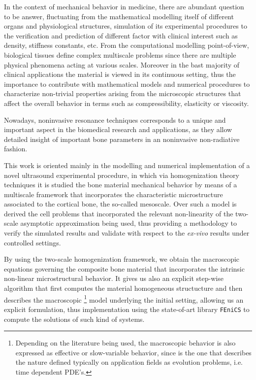 \begin{intro}
In the context of mechanical behavior in medicine, there are abundant question to be answer, fluctuating from the mathematical modelling itself of different organs and physiological structures, simulation of its experimental procedures to the verification and prediction of different factor with clinical interest such as density, stiffness constants, etc. From the computational modelling point-of-view, biological tissues define complex multiscale problems since there are multiple physical phenomena acting at various scales. Moreover in the bast majority of clinical applications the material is viewed in its continuous setting, thus the importance to contribute with mathematical models and numerical procedures to characterize non-trivial properties arising from the microscopic structures that affect the overall behavior in terms such as compressibility, elasticity or viscosity.

Nowadays, noninvasive resonance techniques corresponds to a unique and important aspect in the biomedical research and applications, as they allow detailed insight of important bone parameters in an noninvasive non-radiative fashion.

This work is oriented mainly in the modelling and numerical implementation of a novel ultrasound experimental procedure, in which via homogenization theory techniques it is studied the bone material mechanical behavior by means of a multiscale framework that incorporates the characteristic microstructure associated to the cortical bone, the so-called mesoscale.
Over such a model is derived the cell problems that incorporated the relevant non-linearity of the two-scale asymptotic approximation being used, thus providing a methodology to verify the simulated results and validate with respect to the \textit{ex-vivo} results under controlled settings.

By using the two-scale homogenization framework, we obtain the macroscopic equations governing the composite bone material that incorporates the intrinsic non-linear microstructural behavior.
It gives us also an explicit step-wise algorithm that first computes the material homogeneous structucture and then describes the macroscopic \footnote{Depending on the literature being used, the macroscopic behavior is also expressed as effective or slow-variable behavior, since is the one that describes the nature defined typically on application fields as evolution problems, i.e. time dependent PDE's.} model underlying the initial setting, allowing us an explicit formulation, thus implementation using the state-of-art library \texttt{FEniCS} to compute the solutions of such kind of systems.


\end{intro}
